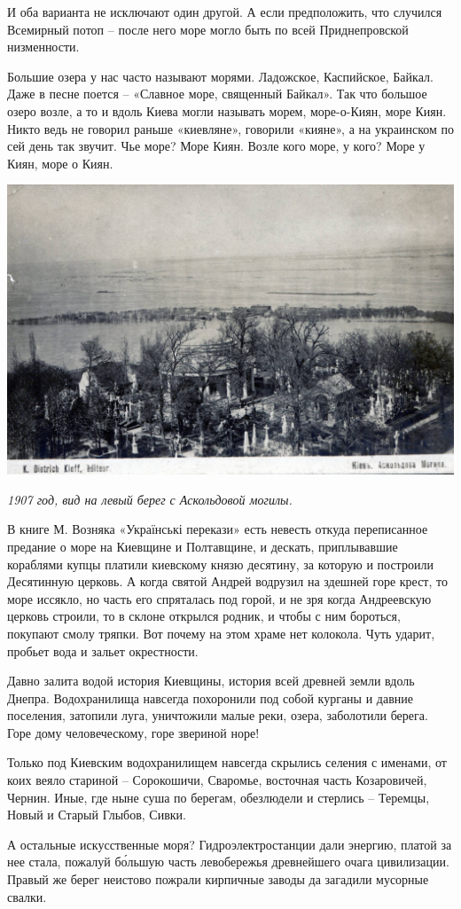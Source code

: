 И оба варианта не исключают один другой. А если предположить, что случился Всемирный потоп – после него море могло быть по всей Приднепровской низменности.

Большие озера у нас часто называют морями. Ладожское, Каспийское, Байкал. Даже в песне поется – «Славное море, священный Байкал». Так что большое озеро возле, а то и вдоль Киева могли называть морем, море-о-Киян, море Киян. Никто ведь не говорил раньше «киевляне», говорили «кияне», а на украинском по сей день так звучит. Чье море? Море Киян. Возле кого море, у кого? Море у Киян, море о Киян.

\vspace*{\fill}
\begin{center}
\includegraphics[width=\linewidth]{chast-gorodki/more/amogila1907.jpg}

\textit{1907 год, вид на левый берег с Аскольдовой могилы.}
\end{center}


В книге М. Возняка «Українські перекази»\cite{vozn01} есть невесть откуда переписанное предание о море на Киевщине и Полтавщине, и дескать, приплывавшие кораблями купцы платили киевскому князю десятину, за которую и построили Десятинную церковь. А когда святой Андрей водрузил на здешней горе крест, то море иссякло, но часть его спряталась под горой, и не зря когда Андреевскую церковь строили, то в склоне открылся родник, и чтобы с ним бороться, покупают смолу тряпки. Вот почему на этом храме нет колокола. Чуть ударит, пробьет вода и зальет окрестности. 

Давно залита водой история Киевщины, история всей древней земли вдоль Днепра. Водохранилища навсегда похоронили под собой курганы и давние поселения, затопили луга, уничтожили малые реки, озера, заболотили берега. Горе дому человеческому, горе звериной норе!

Только под Киевским водохранилищем навсегда скрылись селения с именами, от коих веяло стариной – Сорокошичи, Сваромье, восточная часть Козаровичей, Чернин. Иные, где ныне суша по берегам, обезлюдели и стерлись – Теремцы, Новый и Старый Глыбов, Сивки.

А остальные искусственные моря? Гидроэлектростанции дали энергию, платой за нее стала, пожалуй б\'ольшую часть левобережья древнейшего очага цивилизации. Правый же берег неистово пожрали кирпичные заводы да загадили мусорные свалки.
